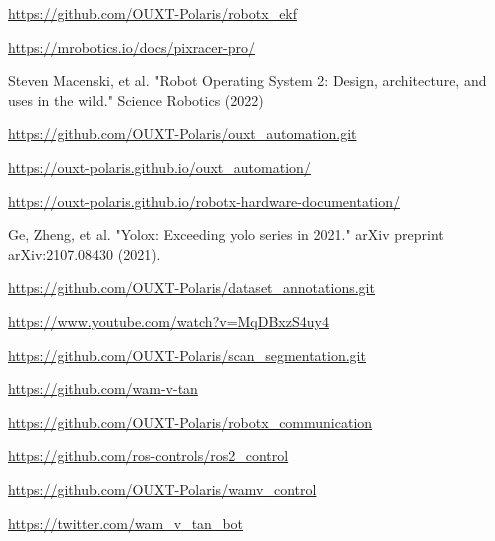 \documentclass[lettersize,journal]{IEEEtran}
\begin{document}
\begin{thebibliography}{1}

    \url{https://github.com/OUXT-Polaris/robotx_ekf}

    \url{https://mrobotics.io/docs/pixracer-pro/}

    Steven Macenski, et al. "Robot Operating System 2: Design, architecture, and uses in the wild." Science Robotics (2022)

    \url{https://github.com/OUXT-Polaris/ouxt_automation.git}

    \url{https://ouxt-polaris.github.io/ouxt_automation/}

    \url{https://ouxt-polaris.github.io/robotx-hardware-documentation/}

    Ge, Zheng, et al. "Yolox: Exceeding yolo series in 2021." arXiv preprint arXiv:2107.08430 (2021).

    \url{https://github.com/OUXT-Polaris/dataset_annotations.git}

    \url{https://www.youtube.com/watch?v=MqDBxzS4uy4}

    \url{https://github.com/OUXT-Polaris/scan_segmentation.git}

    \url{https://github.com/wam-v-tan}

    \url{https://github.com/OUXT-Polaris/robotx_communication}

    \url{https://github.com/ros-controls/ros2_control}

    \url{https://github.com/OUXT-Polaris/wamv_control}

    \url{https://twitter.com/wam_v_tan_bot}

\end{thebibliography}

\vfill
\end{document}
